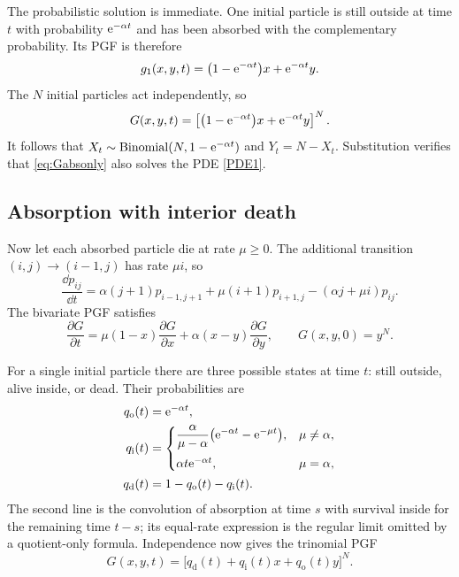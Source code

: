 The probabilistic solution is immediate.  One initial particle is still outside
at time \(t\) with probability \(\mathrm{e}^{-\alpha t}\) and has been absorbed with the
complementary probability.  Its PGF is therefore
\[
  g_1(x,y,t)=\bigl(1-\mathrm{e}^{-\alpha t}\bigr)x+\mathrm{e}^{-\alpha t}y.
\]
The \(N\) initial particles act independently, so
\begin{equation}
  G(x,y,t)=
  \left[
    \bigl(1-\mathrm{e}^{-\alpha t}\bigr)x+\mathrm{e}^{-\alpha t}y
  \right]^N.
  \label{eq:Gabsonly}
\end{equation}
It follows that
\(X_t\sim\operatorname{Binomial}(N,1-\mathrm{e}^{-\alpha t})\) and
\(Y_t=N-X_t\).  Substitution verifies that \eqref{eq:Gabsonly} also solves the
PDE \eqref{PDE1}.

\subsection{Absorption with interior death}
\label{sec:absdeath}

Now let each absorbed particle die at rate \(\mu\geq0\).  The additional
transition \((i,j)\to(i-1,j)\) has rate \(\mu i\), so
\begin{equation}
  \frac{\dd p_{ij}}{\dd t}
  =\alpha(j+1)p_{i-1,j+1}
  +\mu(i+1)p_{i+1,j}
  -(\alpha j+\mu i)p_{ij}.
  \label{eq:absdeath-master}
\end{equation}
The bivariate PGF satisfies
\begin{equation}
  \frac{\partial G}{\partial t}
  =\mu(1-x)\frac{\partial G}{\partial x}
  +\alpha(x-y)\frac{\partial G}{\partial y},
  \qquad G(x,y,0)=y^N.
  \label{PDE2}
\end{equation}

For a single initial particle there are three possible states at time \(t\): still
outside, alive inside, or dead.  Their probabilities are
\begin{align}
  q_{\mathrm o}(t)&=\mathrm{e}^{-\alpha t},
  \label{eq:qoutside}\\
  q_{\mathrm i}(t)&=
  \begin{cases}
    \displaystyle
    \frac{\alpha}{\mu-\alpha}
    \bigl(\mathrm{e}^{-\alpha t}-\mathrm{e}^{-\mu t}\bigr),
    &\mu\neq\alpha,\\[9pt]
    \alpha t\mathrm{e}^{-\alpha t},&\mu=\alpha,
  \end{cases}
  \label{eq:qinside}\\
  q_{\mathrm d}(t)&=1-q_{\mathrm o}(t)-q_{\mathrm i}(t).
  \label{eq:qdead}
\end{align}
The second line is the convolution of absorption at time \(s\) with survival
inside for the remaining time \(t-s\); its equal-rate expression is the regular
limit omitted by a quotient-only formula.  Independence now gives the trinomial
PGF
\begin{equation}
  G(x,y,t)
  =\bigl[q_{\mathrm d}(t)+q_{\mathrm i}(t)x+q_{\mathrm o}(t)y\bigr]^N.
  \label{eq:Gabsdeath}
\end{equation}

